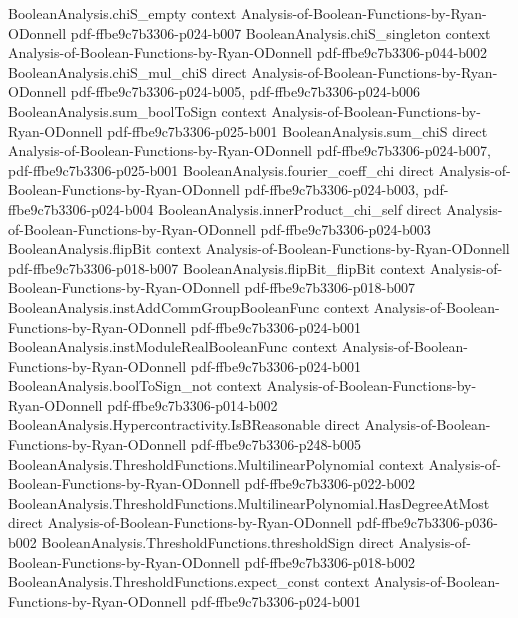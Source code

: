 \begin{theorem}
\proofstep
  {BooleanAnalysis.chiS_empty}
  {context}
  {Analysis-of-Boolean-Functions-by-Ryan-ODonnell}
  {pdf-ffbe9c7b3306-p024-b007}
\proofstep
  {BooleanAnalysis.chiS_singleton}
  {context}
  {Analysis-of-Boolean-Functions-by-Ryan-ODonnell}
  {pdf-ffbe9c7b3306-p044-b002}
\proofstep
  {BooleanAnalysis.chiS_mul_chiS}
  {direct}
  {Analysis-of-Boolean-Functions-by-Ryan-ODonnell}
  {pdf-ffbe9c7b3306-p024-b005,
    pdf-ffbe9c7b3306-p024-b006}
\proofstep
  {BooleanAnalysis.sum_boolToSign}
  {context}
  {Analysis-of-Boolean-Functions-by-Ryan-ODonnell}
  {pdf-ffbe9c7b3306-p025-b001}
\proofstep
  {BooleanAnalysis.sum_chiS}
  {direct}
  {Analysis-of-Boolean-Functions-by-Ryan-ODonnell}
  {pdf-ffbe9c7b3306-p024-b007,
    pdf-ffbe9c7b3306-p025-b001}
\proofstep
  {BooleanAnalysis.fourier_coeff_chi}
  {direct}
  {Analysis-of-Boolean-Functions-by-Ryan-ODonnell}
  {pdf-ffbe9c7b3306-p024-b003,
    pdf-ffbe9c7b3306-p024-b004}
\proofstep
  {BooleanAnalysis.innerProduct_chi_self}
  {direct}
  {Analysis-of-Boolean-Functions-by-Ryan-ODonnell}
  {pdf-ffbe9c7b3306-p024-b003}
\proofstep
  {BooleanAnalysis.flipBit}
  {context}
  {Analysis-of-Boolean-Functions-by-Ryan-ODonnell}
  {pdf-ffbe9c7b3306-p018-b007}
\proofstep
  {BooleanAnalysis.flipBit_flipBit}
  {context}
  {Analysis-of-Boolean-Functions-by-Ryan-ODonnell}
  {pdf-ffbe9c7b3306-p018-b007}
\proofstep
  {BooleanAnalysis.instAddCommGroupBooleanFunc}
  {context}
  {Analysis-of-Boolean-Functions-by-Ryan-ODonnell}
  {pdf-ffbe9c7b3306-p024-b001}
\proofstep
  {BooleanAnalysis.instModuleRealBooleanFunc}
  {context}
  {Analysis-of-Boolean-Functions-by-Ryan-ODonnell}
  {pdf-ffbe9c7b3306-p024-b001}
\proofstep
  {BooleanAnalysis.boolToSign_not}
  {context}
  {Analysis-of-Boolean-Functions-by-Ryan-ODonnell}
  {pdf-ffbe9c7b3306-p014-b002}
\proofstep
  {BooleanAnalysis.Hypercontractivity.IsBReasonable}
  {direct}
  {Analysis-of-Boolean-Functions-by-Ryan-ODonnell}
  {pdf-ffbe9c7b3306-p248-b005}
\proofstep
  {BooleanAnalysis.ThresholdFunctions.MultilinearPolynomial}
  {context}
  {Analysis-of-Boolean-Functions-by-Ryan-ODonnell}
  {pdf-ffbe9c7b3306-p022-b002}
\proofstep
  {BooleanAnalysis.ThresholdFunctions.MultilinearPolynomial.HasDegreeAtMost}
  {direct}
  {Analysis-of-Boolean-Functions-by-Ryan-ODonnell}
  {pdf-ffbe9c7b3306-p036-b002}
\proofstep
  {BooleanAnalysis.ThresholdFunctions.thresholdSign}
  {direct}
  {Analysis-of-Boolean-Functions-by-Ryan-ODonnell}
  {pdf-ffbe9c7b3306-p018-b002}
\proofstep
  {BooleanAnalysis.ThresholdFunctions.expect_const}
  {context}
  {Analysis-of-Boolean-Functions-by-Ryan-ODonnell}
  {pdf-ffbe9c7b3306-p024-b001}

\end{theorem}
